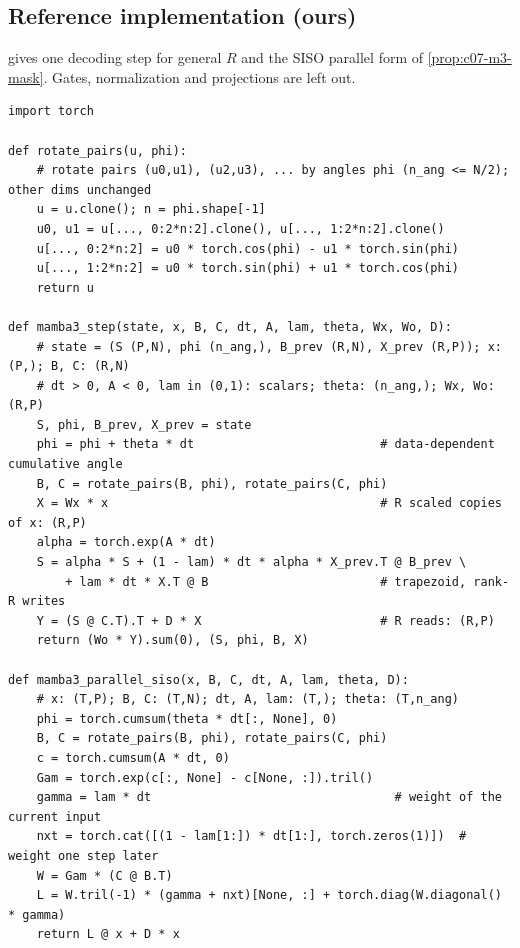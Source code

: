 \subsection{Reference implementation (ours)}

 gives one decoding step for general $R$ and the SISO parallel form of
\cref{prop:c07-m3-mask}. Gates, normalization and projections are left out.

\begin{lstlisting}[float=t,caption={Reference implementation (ours): Mamba-3 step (MIMO) and SISO parallel form.},label={lst:c07-m3}]
import torch

def rotate_pairs(u, phi):
    # rotate pairs (u0,u1), (u2,u3), ... by angles phi (n_ang <= N/2); other dims unchanged
    u = u.clone(); n = phi.shape[-1]
    u0, u1 = u[..., 0:2*n:2].clone(), u[..., 1:2*n:2].clone()
    u[..., 0:2*n:2] = u0 * torch.cos(phi) - u1 * torch.sin(phi)
    u[..., 1:2*n:2] = u0 * torch.sin(phi) + u1 * torch.cos(phi)
    return u

def mamba3_step(state, x, B, C, dt, A, lam, theta, Wx, Wo, D):
    # state = (S (P,N), phi (n_ang,), B_prev (R,N), X_prev (R,P)); x: (P,); B, C: (R,N)
    # dt > 0, A < 0, lam in (0,1): scalars; theta: (n_ang,); Wx, Wo: (R,P)
    S, phi, B_prev, X_prev = state
    phi = phi + theta * dt                          # data-dependent cumulative angle
    B, C = rotate_pairs(B, phi), rotate_pairs(C, phi)
    X = Wx * x                                      # R scaled copies of x: (R,P)
    alpha = torch.exp(A * dt)
    S = alpha * S + (1 - lam) * dt * alpha * X_prev.T @ B_prev \
        + lam * dt * X.T @ B                        # trapezoid, rank-R writes
    Y = (S @ C.T).T + D * X                         # R reads: (R,P)
    return (Wo * Y).sum(0), (S, phi, B, X)

def mamba3_parallel_siso(x, B, C, dt, A, lam, theta, D):
    # x: (T,P); B, C: (T,N); dt, A, lam: (T,); theta: (T,n_ang)
    phi = torch.cumsum(theta * dt[:, None], 0)
    B, C = rotate_pairs(B, phi), rotate_pairs(C, phi)
    c = torch.cumsum(A * dt, 0)
    Gam = torch.exp(c[:, None] - c[None, :]).tril()
    gamma = lam * dt                                  # weight of the current input
    nxt = torch.cat([(1 - lam[1:]) * dt[1:], torch.zeros(1)])  # weight one step later
    W = Gam * (C @ B.T)
    L = W.tril(-1) * (gamma + nxt)[None, :] + torch.diag(W.diagonal() * gamma)
    return L @ x + D * x
\end{lstlisting}

